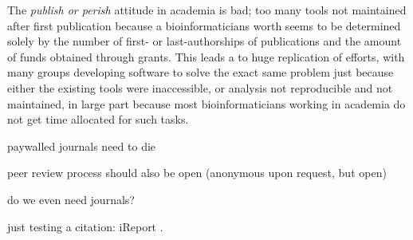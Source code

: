The \textit{publish or perish} attitude in academia is bad; too many tools not maintained after first publication because a bioinformaticians worth seems to be determined solely by the number of first- or last-authorships of publications and the amount of funds obtained through grants. This leads a to huge replication of efforts, with many groups developing software to solve the exact same problem just because either the existing tools were inaccessible, or analysis not reproducible and not maintained, in large part because most bioinformaticians working in academia do not get time allocated for such tasks.

paywalled journals need to die

peer review process should also be open (anonymous upon request, but open)

do we even need journals?


just testing a citation: iReport \cite{ireport}.



